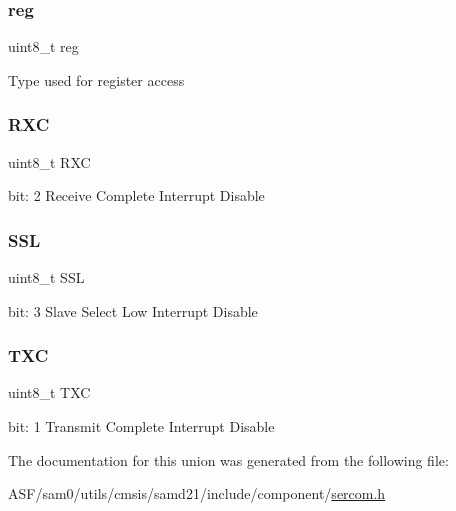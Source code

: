 \subsubsection{\texorpdfstring{reg}{reg}}
{\footnotesize\ttfamily uint8\+\_\+t reg}

Type used for register access \mbox{\label{union_s_e_r_c_o_m___s_p_i___i_n_t_e_n_c_l_r___type_ad465929f0a73cbdc2d5ab6b210909039}} 
\subsubsection{\texorpdfstring{RXC}{RXC}}
{\footnotesize\ttfamily uint8\+\_\+t R\+XC}

bit\+: 2 Receive Complete Interrupt Disable \mbox{\label{union_s_e_r_c_o_m___s_p_i___i_n_t_e_n_c_l_r___type_ac2a5326783ce5e9d294fabed8aba7d3f}} 
\subsubsection{\texorpdfstring{SSL}{SSL}}
{\footnotesize\ttfamily uint8\+\_\+t S\+SL}

bit\+: 3 Slave Select Low Interrupt Disable \mbox{\label{union_s_e_r_c_o_m___s_p_i___i_n_t_e_n_c_l_r___type_a8f012b40a2f5cf52b14d448b314b5cec}} 
\subsubsection{\texorpdfstring{TXC}{TXC}}
{\footnotesize\ttfamily uint8\+\_\+t T\+XC}

bit\+: 1 Transmit Complete Interrupt Disable 

The documentation for this union was generated from the following file\+:\begin{DoxyCompactItemize}
\item 
A\+S\+F/sam0/utils/cmsis/samd21/include/component/\mbox{\hyperlink{utils_2cmsis_2samd21_2include_2component_2sercom_8h}{sercom.\+h}}\end{DoxyCompactItemize}
